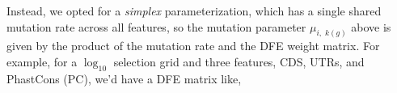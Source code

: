 \documentclass[11pt]{article}
\begin{document}




Instead, we opted for a \emph{simplex} parameterization, which has a single
shared mutation rate across all features, so the mutation parameter $\mu_{i,
\;k(g)}$ above is given by the product of the mutation rate and the DFE weight
matrix. For example, for a $\log_{10}$ selection grid and three features, CDS,
UTRs, and PhastCons (PC), we'd have a DFE matrix like,
\end{document}
